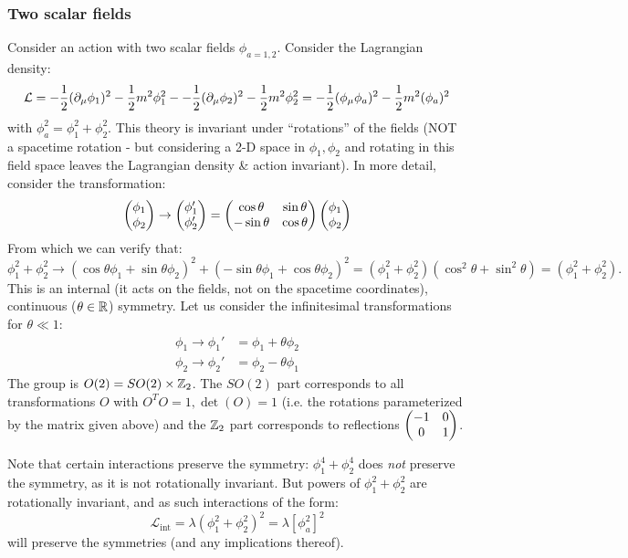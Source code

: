 \subsubsection*{Two scalar fields}
Consider an action with two scalar fields $\phi_{a=1,2}$. Consider the Lagrangian density:
\begin{equation}
    \mathcal{L} = -\frac{1}{2}(\partial_\mu \phi_1)^2 - \frac{1}{2}m^2\phi_1^2 --\frac{1}{2}(\partial_\mu \phi_2)^2 - \frac{1}{2}m^2\phi_2^2 = -\frac{1}{2}(\phi_\mu \phi_a)^2 - \frac{1}{2}m^2(\phi_a)^2
\end{equation}
with $\phi_a^2 = \phi_1^2 + \phi_2^2$. This theory is invariant under ``rotations'' of the fields (NOT a spacetime rotation - but considering a 2-D space in $\phi_1, \phi_2$ and rotating in this field space leaves the Lagrangian density \& action invariant). In more detail, consider the transformation:
\begin{equation}
    \begin{pmatrix}\phi_1 \\ \phi_2\end{pmatrix} \to \begin{pmatrix}\phi_1' \\ \phi_2'\end{pmatrix} = \begin{pmatrix}\cos\theta & \sin\theta \\ -\sin\theta & \cos\theta\end{pmatrix}\begin{pmatrix}\phi_1\\ \phi_2\end{pmatrix}
\end{equation}
From which we can verify that:
\begin{equation}
    \phi_1^2 + \phi_2^2 \to (\cos\theta\phi_1  + \sin\theta\phi_2)^2 +(-\sin\theta\phi_1  + \cos\theta\phi_2)^2 = (\phi_1^2 + \phi_2^2)(\cos^2\theta + \sin^2\theta) =  (\phi_1^2 + \phi_2^2).
\end{equation}
This is an internal (it acts on the fields, not on the spacetime coordinates), continuous ($\theta \in \mathbb{R}$) symmetry. Let us consider the infinitesimal transformations for $\theta \ll 1$:
\begin{subequations}
    \begin{align}
        \phi_1 \to \phi_1' &= \phi_1 + \theta\phi_2
        \\ \phi_2 \to \phi_2' &= \phi_2 - \theta\phi_1
    \end{align}
\end{subequations}
The group is $O(2) = SO(2) \times \mathbb{Z}_2$. The $SO(2)$ part corresponds to all transformations $O$ with $O^TO = 1, \det(O) = 1$ (i.e. the rotations parameterized by the matrix given above) and the $\mathbb{Z}_2$ part corresponds to reflections $\begin{pmatrix}-1 & 0 \\ 0 & 1\end{pmatrix}$.

Note that certain interactions preserve the symmetry: $\phi_1^4 + \phi_2^4$ does \emph{not} preserve the symmetry, as it is not rotationally invariant. But powers of $\phi_1^2 + \phi_2^2$ are rotationally invariant, and as such interactions of the form:
\begin{equation}
    \mathcal{L}_{\text{int}} = \lambda(\phi_1^2 + \phi_2^2)^2 = \lambda[\phi_a^2]^2
\end{equation}
will preserve the symmetries (and any implications thereof).

